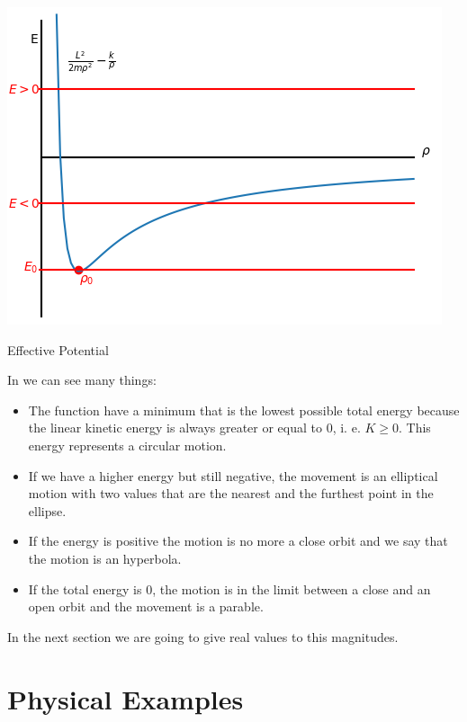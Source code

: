 \begin{marginfigure}
    \includegraphics{images/general.png}
    \caption[Effective Potential]{Effective Potential}
\end{marginfigure}

In  we can see many things:

\begin{itemize}
    \item The function have a minimum that is the lowest possible total energy because the linear kinetic energy is always greater or equal to 0, i. e. $K\geq0$. This energy represents a circular motion.

    \item If we have a higher energy but still negative, the movement is an elliptical motion with two values that are the nearest and the furthest point in the ellipse.

    \item If the energy is positive the motion is no more a close orbit and we say that the motion is an hyperbola.

    \item If the total energy is 0, the motion is in the limit between a close and an open orbit and the movement is a parable.
\end{itemize}

In the next section we are going to give real values to this magnitudes.

\section{Physical Examples}

